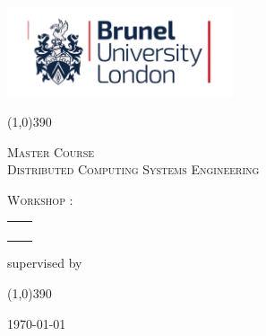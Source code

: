 \begin{titlepage}
	\flushright
	\includegraphics[width=0.50\textwidth]{res/Brunel_University_Logo.png}\par
	\centering
	\line(1,0){390}\\
	\vfill
	{\scshape\Large Master Course \\
	Distributed Computing Systems Engineering \par}
	\vspace{1.5cm}
	{\scshape\Large Workshop \courseNumber: \par}
	{\Huge\bfseries \assignmentName\par}
	\vspace{1.5cm}
	
	\begin{tabular}{rl}
	{\itshape \assignmentAuthorOne } & {\itshape \studentNumberOne }\\
	{\itshape \assignmentAuthorTwo } & {\itshape \studentNumberTwo }\\
	{\itshape \assignmentAuthorThree } & {\itshape \studentNumberThree
	}\\
	{\itshape \assignmentAuthorFour } & {\itshape \studentNumberFour
	}\\
	\end{tabular}
		
	\vspace{1cm}
	supervised by\par
	\prof

	\vfill
	\line(1,0){390}
	\flushleft
	{\large \today\par}
\end{titlepage}